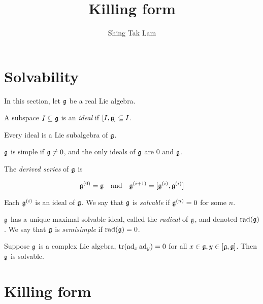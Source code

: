 \documentclass{article}
\title{Killing form}
\author{Shing Tak Lam}
\DeclareMathOperator{\rad}{rad}
\begin{document}
\maketitle

\section{Solvability}

In this section, let \(\mathfrak{g}\) be a real Lie algebra.

\begin{definition}
    [ideal] A subspace \(I \subseteq \mathfrak{g}\) is an \emph{ideal} if \([I, \mathfrak{g}] \subseteq I\).
\end{definition}

\begin{remark}
    Every ideal is a Lie subalgebra of \(\mathfrak{g}\).
\end{remark}

\begin{definition}
    [simple] \(\mathfrak{g}\) is simple if \(\mathfrak{g} \ne 0\), and the only ideals of \(\mathfrak{g}\) are \(0\) and \(\mathfrak{g}\).
\end{definition}

\begin{definition}
     The \emph{derived series} of \(\mathfrak{g}\) is

    \[\mfg^{(0)} = \mfg \qqtext{and} \mfg^{(i+1)} = [\mfg^{(i)}, \mfg^{(i)}]\]

    Each \(\mathfrak{g}^{(i)}\) is an ideal of \(\mathfrak{g}\). We say that \(\mathfrak{g}\) is \emph{solvable} if \(\mathfrak{g}^{(n)} = 0\) for some \(n\).
\end{definition}

\begin{definition}

    \(\mathfrak{g}\) has a unique maximal solvable ideal, called the \emph{radical} of \(\mathfrak{g}\), and denoted \(\rad(\mfg)\). We say that \(\mathfrak{g}\) is \emph{semisimple} if \(\rad(\mfg) = 0\).
\end{definition}

\begin{lemma}
    \label{lem:solv}
    Suppose \(\mathfrak{g}\) is a complex Lie algebra, \(\tr(\operatorname{ad}_x\operatorname{ad}_y) = 0\) for all \(x \in \mathfrak{g}, y \in [\mathfrak{g}, \mathfrak{g}]\). Then \(\mathfrak{g}\) is solvable.
\end{lemma}

\section{Killing form}
\end{document}
